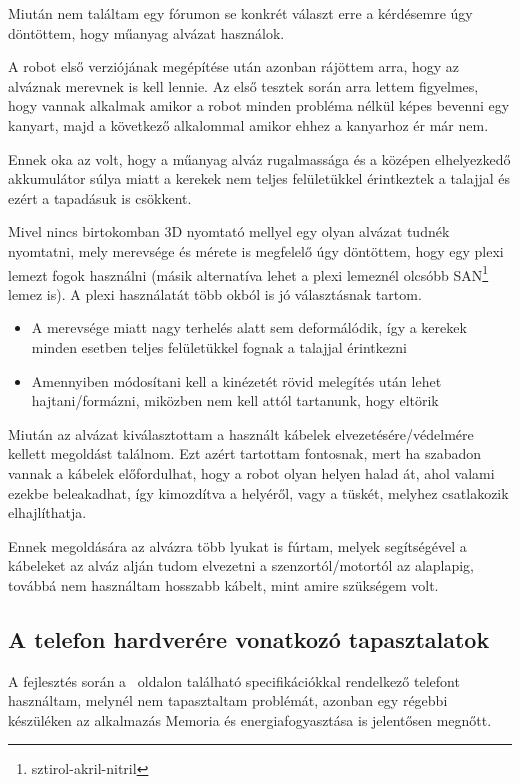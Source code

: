 \documentclass[]{thesis-ekf}
\theoremstyle{definition}
\begin{document}
Miután nem találtam egy fórumon se konkrét választ erre a kérdésemre úgy döntöttem, hogy műanyag alvázat használok.

A robot első verziójának megépítése után azonban rájöttem arra, hogy az alváznak merevnek is kell lennie. Az első tesztek során arra lettem figyelmes, hogy vannak alkalmak amikor a robot minden probléma nélkül képes bevenni egy kanyart, majd a következő alkalommal amikor ehhez a kanyarhoz ér már nem.

Ennek oka az volt, hogy a műanyag alváz rugalmassága és a középen elhelyezkedő akkumulátor súlya miatt a kerekek nem teljes felületükkel érintkeztek a talajjal és ezért a tapadásuk is csökkent.

Mivel nincs birtokomban 3D nyomtató mellyel egy olyan alvázat tudnék nyomtatni, mely merevsége és mérete is megfelelő úgy döntöttem, hogy egy plexi lemezt fogok használni (másik alternatíva lehet a plexi lemeznél olcsóbb SAN\footnote{sztirol-akril-nitril} lemez is). A plexi használatát több okból is jó választásnak tartom.
\begin{itemize}
	\item A merevsége miatt nagy terhelés alatt sem deformálódik, így a kerekek minden esetben teljes felületükkel fognak a talajjal érintkezni
	\item Amennyiben módosítani kell a kinézetét rövid melegítés után lehet hajtani/formázni, miközben nem kell attól tartanunk, hogy eltörik
\end{itemize}

Miután az alvázat kiválasztottam a használt kábelek elvezetésére/védelmére kellett megoldást találnom. Ezt azért tartottam fontosnak, mert ha szabadon vannak a kábelek előfordulhat, hogy a robot olyan helyen halad át, ahol valami ezekbe beleakadhat, így kimozdítva a helyéről, vagy a tüskét, melyhez csatlakozik elhajlíthatja.

Ennek megoldására az alvázra több lyukat is fúrtam, melyek segítségével a kábeleket az alváz alján tudom elvezetni a szenzortól/motortól az alaplapig, továbbá nem használtam hosszabb kábelt, mint amire szükségem volt.
\subsection{A telefon hardverére vonatkozó tapasztalatok}
A fejlesztés során a \pageref{label}~oldalon található specifikációkkal rendelkező telefont használtam, melynél nem tapasztaltam problémát, azonban egy régebbi készüléken az alkalmazás Memoria és energiafogyasztása is jelentősen megnőtt.
\end{document}
